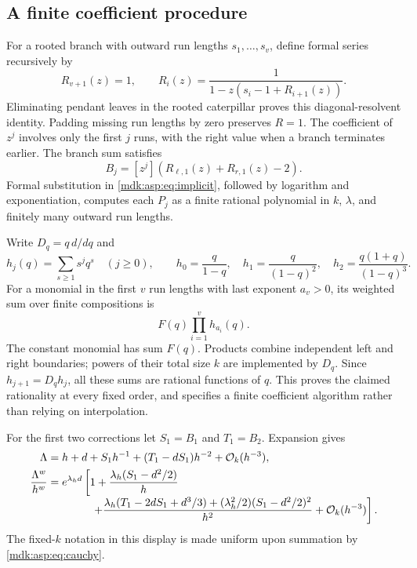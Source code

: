 \documentclass[11pt,letterpaper]{article}
\numberwithin{equation}{section}
\theoremstyle{remark}\newtheorem{remark}[theorem]{Remark}
\newcommand{\Oh}{\mathcal O}\newcommand{\Q}{\mathbb Q}\newcommand{\N}{\mathbb N}\newcommand{\R}{\mathbb R}
\begin{document}
\subsection{A finite coefficient procedure}\label{mdk:asp:sec:coeff}
For a rooted branch with outward run lengths $s_1,\ldots,s_v$, define formal series recursively by
\begin{equation}\label{mdk:asp:eq:resolvent}
R_{v+1}(z)=1,\qquad
R_i(z)=\frac1{1-z(s_i-1+R_{i+1}(z))}.
\end{equation}
Eliminating pendant leaves in the rooted caterpillar proves this diagonal-resolvent identity. Padding missing run lengths by zero preserves $R=1$. The coefficient of $z^j$ involves only the first $j$ runs, with the right value when a branch terminates earlier. The branch sum satisfies
\[
B_j=[z^j](R_{\ell,1}(z)+R_{r,1}(z)-2).
\]
Formal substitution in \eqref{mdk:asp:eq:implicit}, followed by logarithm and exponentiation, computes each $P_j$ as a finite rational polynomial in $k$, $\lambda$, and finitely many outward run lengths.

Write $D_q=q\,d/dq$ and
\[
h_j(q)=\sum_{s\ge1}s^jq^s\quad(j\ge0),\qquad h_0=\frac q{1-q},\quad
h_1=\frac q{(1-q)^2},\quad h_2=\frac{q(1+q)}{(1-q)^3}.
\]
For a monomial in the first $v$ run lengths with last exponent $a_v>0$, its weighted sum over finite compositions is
\[
F(q)\prod_{i=1}^v h_{a_i}(q).
\]
The constant monomial has sum $F(q)$. Products combine independent left and right boundaries; powers of their total size $k$ are implemented by $D_q$. Since $h_{j+1}=D_qh_j$, all these sums are rational functions of $q$. This proves the claimed rationality at every fixed order, and specifies a finite coefficient algorithm rather than relying on interpolation.

For the first two corrections let $S_1=B_1$ and $T_1=B_2$. Expansion gives
\begin{align}
\Lambda&=h+d+S_1h^{-1}+(T_1-dS_1)h^{-2}+\Oh_k(h^{-3}),\label{mdk:asp:eq:lambdaexpand}\\
\frac{\Lambda^w}{h^w}
&=e^{\lambda_h d}\left[1+\frac{\lambda_h(S_1-d^2/2)}h\right.\notag\\[-0.3em]
&\hspace{4em}\left.+\frac{\lambda_h(T_1-2dS_1+d^3/3)
 +(\lambda_h^2/2)(S_1-d^2/2)^2}{h^2}+\Oh_k(h^{-3})\right].\label{mdk:asp:eq:perronexpand}
\end{align}
The fixed-$k$ notation in this display is made uniform upon summation by \eqref{mdk:asp:eq:cauchy}.
\end{document}
